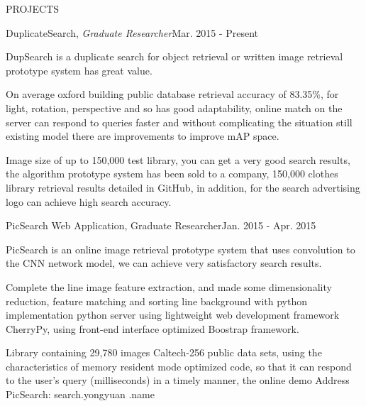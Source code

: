 \documentclass{resume} %
\begin{document}

\begin{rSection}{PROJECTS}

\begin{rSubsection}{DuplicateSearch, \em Graduate Researcher}{Mar. 2015 - Present}{}{}
\item DupSearch is a duplicate search for object retrieval or written image retrieval prototype system has great value.
\item On average oxford building public database retrieval accuracy of 83.35\%, for light, rotation, perspective and so has good adaptability, online match on the server can respond to queries faster and without complicating the situation still existing model there are improvements to improve mAP space.
\item Image size of up to 150,000 test library, you can get a very good search results, the algorithm prototype system has been sold to a company, 150,000 clothes library retrieval results detailed in GitHub, in addition, for the search advertising logo can achieve high search accuracy.
\end{rSubsection}


\begin{rSubsection}{PicSearch  Web Application, Graduate Researcher}{Jan. 2015 - Apr. 2015}{}{}
\item PicSearch is an online image retrieval prototype system that uses convolution to the CNN network model, we can achieve very satisfactory search results.
\item Complete the line image feature extraction, and made some dimensionality reduction, feature matching and sorting line background with python implementation python server using lightweight web development framework CherryPy, using front-end interface optimized Boostrap framework.
\item Library containing 29,780 images Caltech-256 public data sets, using the characteristics of memory resident mode optimized code, so that it can respond to the user's query (milliseconds) in a timely manner, the online demo Address PicSearch: search.yongyuan .name
\end{rSubsection}



\end{rSection}
\end{document}

